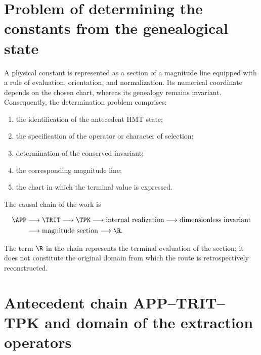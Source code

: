 \label{chap:p3-83-23-algebra_clasificacion}





\label{p3-83-c23-s1:ch:foundation}

\section{Problem of determining the constants from the genealogical state}

A physical constant is represented as a section of a magnitude line equipped with a rule of evaluation, orientation, and normalization. Its numerical coordinate depends on the chosen chart, whereas its genealogy remains invariant. Consequently, the determination problem comprises:

\begin{enumerate}
\item the identification of the antecedent HMT state;
\item the specification of the operator or character of selection;
\item determination of the conserved invariant;
\item the corresponding magnitude line;
\item the chart in which the terminal value is expressed.
\end{enumerate}

The causal chain of the work is

\begin{equation}
\begin{aligned}
\APP&\longrightarrow\TRIT\longrightarrow\TPK
\longrightarrow\text{internal realization}
\longrightarrow\text{dimensionless invariant}\\
&\longrightarrow\text{magnitude section}
\longrightarrow\R.
\end{aligned}
\label{p3-83-c23-s1:eq:master-chain}
\end{equation}

The term \(\R\) in the chain represents the terminal evaluation of the
section; it does not constitute the original domain from which the
route is retrospectively reconstructed.

\section{Antecedent chain APP--TRIT--TPK and domain of the extraction operators}

